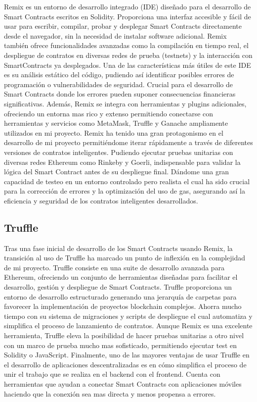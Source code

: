 Remix es un entorno de desarrollo integrado (IDE) diseñado para el desarrollo de Smart Contracts escritos en Solidity. Proporciona una interfaz accesible y fácil de usar para escribir, compilar, probar y desplegar Smart Contracts directamente desde el navegador, sin la necesidad de instalar software adicional.
Remix también ofrece funcionalidades avanzadas como la compilación en tiempo real, el despliegue de contratos en diversas redes de prueba (testnets) y la interacción con SmartContracts ya desplegados.
Una de las características más útiles de este IDE es su análisis estático del código, pudiendo así identificar posibles errores de programación o vulnerabilidades de seguridad. Crucial para el desarrollo de Smart Contracts donde los errores pueden suponer consecuencias financieras significativas.
Además, Remix se integra con herramientas y plugins adicionales, ofreciendo un entorna mas rico y extenso permitiendo conectarse con herramientas y servicios como MetaMask, Truffle y Ganache ampliamente utilizados en mi proyecto.
Remix ha tenido una gran protagonismo en el desarrollo de mi proyecto permitiéndome iterar rápidamente a través de diferentes versiones de contratos inteligentes. Pudiendo ejecutar pruebas unitarias con diversas redes Ethereum como Rinkeby y Goerli, indispensable para validar la lógica del Smart Contract antes de su despliegue final. Dándome una gran capacidad de testeo en un entorno controlado pero realista el cual ha sido crucial para la corrección de errores y la optimización del uso de gas, asegurando así la eficiencia y seguridad de los contratos inteligentes desarrollados.


\subsection{Truffle}

Tras una fase inicial de desarrollo de los Smart Contracts usando Remix, la transición al uso de Truffle ha marcado un punto de inflexión en la complejidad de mi proyecto.
Truffle consiste en una suite de desarrollo avanzada para Ethereum, ofreciendo un conjunto de herramientas diseñadas para facilitar el desarrollo, gestión y despliegue de Smart Contracts.
Truffle proporciona un entorno de desarrollo estructurado generando una jerarquía de carpetas para favorecer la implementación de proyectos blockchain complejos.
Ahorra mucho tiempo con su sistema de migraciones y scripts de despliegue el cual automatiza y simplifica el proceso de lanzamiento de contratos.
Aunque Remix es una excelente herramienta, Truffle eleva la posibilidad de hacer pruebas unitarias a otro nivel con un marco de prueba mucho mas sofisticado, permitiendo ejecutar test en Solidity o JavaScript.
Finalmente, uno de las mayores ventajas de usar Truffle en el desarrollo de aplicaciones descentralizadas es en cómo simplifica el proceso de unir el trabajo que se realiza en el backend con el frontend. Cuenta con herramientas que ayudan a conectar Smart Contracts con aplicaciones móviles haciendo que la conexión sea mas directa y menos propensa a errores.


